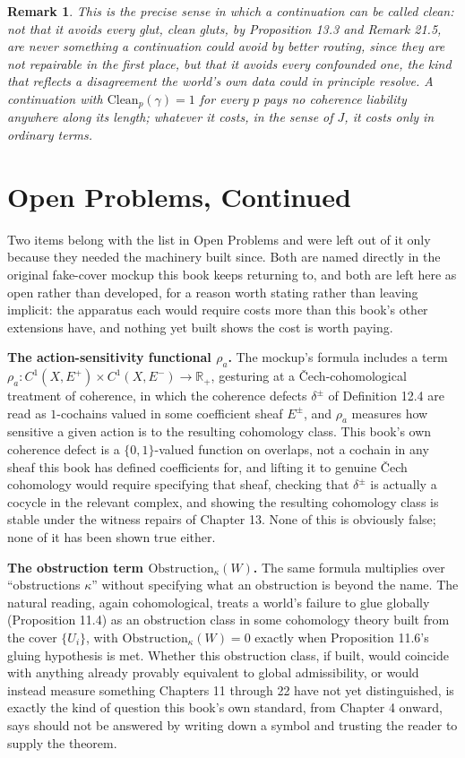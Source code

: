 \documentclass[11pt]{book}
\newtheorem*{appendixremark}{Remark}
\begin{document}
\begin{appendixremark}
This is the precise sense in which a continuation can be called clean: not that it avoids every glut, clean gluts, by Proposition 13.3 and Remark 21.5, are never something a continuation could avoid by better routing, since they are not repairable in the first place, but that it avoids every \emph{confounded} one, the kind that reflects a disagreement the world's own data could in principle resolve. A continuation with $\mathrm{Clean}_p(\gamma) = 1$ for every $p$ pays no coherence liability anywhere along its length; whatever it costs, in the sense of $J$, it costs only in ordinary terms.
\end{appendixremark}

\chapter*{Open Problems, Continued}

Two items belong with the list in Open Problems and were left out of it only because they needed the machinery built since. Both are named directly in the original fake-cover mockup this book keeps returning to, and both are left here as open rather than developed, for a reason worth stating rather than leaving implicit: the apparatus each would require costs more than this book's other extensions have, and nothing yet built shows the cost is worth paying.

\textbf{The action-sensitivity functional $\rho_a$.} The mockup's formula includes a term $\rho_a : C^1(X, E^+) \times C^1(X, E^-) \to \mathbb R_+$, gesturing at a Čech-cohomological treatment of coherence, in which the coherence defects $\delta^\pm$ of Definition 12.4 are read as $1$-cochains valued in some coefficient sheaf $E^\pm$, and $\rho_a$ measures how sensitive a given action is to the resulting cohomology class. This book's own coherence defect is a $\{0,1\}$-valued function on overlaps, not a cochain in any sheaf this book has defined coefficients for, and lifting it to genuine Čech cohomology would require specifying that sheaf, checking that $\delta^\pm$ is actually a cocycle in the relevant complex, and showing the resulting cohomology class is stable under the witness repairs of Chapter 13. None of this is obviously false; none of it has been shown true either.

\textbf{The obstruction term $\mathrm{Obstruction}_\kappa(W)$.} The same formula multiplies over ``obstructions $\kappa$'' without specifying what an obstruction is beyond the name. The natural reading, again cohomological, treats a world's failure to glue globally (Proposition 11.4) as an obstruction class in some cohomology theory built from the cover $\{U_i\}$, with $\mathrm{Obstruction}_\kappa(W) = 0$ exactly when Proposition 11.6's gluing hypothesis is met. Whether this obstruction class, if built, would coincide with anything already provably equivalent to global admissibility, or would instead measure something Chapters 11 through 22 have not yet distinguished, is exactly the kind of question this book's own standard, from Chapter 4 onward, says should not be answered by writing down a symbol and trusting the reader to supply the theorem.
\end{document}

